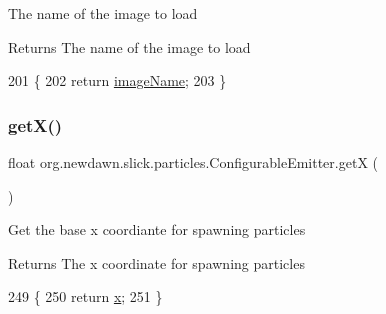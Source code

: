 The name of the image to load

\begin{DoxyReturn}{Returns}
The name of the image to load 
\end{DoxyReturn}

\begin{DoxyCode}
201                                  \{
202         \textcolor{keywordflow}{return} \mbox{\hyperlink{classorg_1_1newdawn_1_1slick_1_1particles_1_1_configurable_emitter_a912693fc97b59864d7ee322ad4f6ec17}{imageName}};
203     \}
\end{DoxyCode}
\mbox{\label{classorg_1_1newdawn_1_1slick_1_1particles_1_1_configurable_emitter_a726b720c6e526c8a7d165d6f111ef3db}} 
\subsubsection{\texorpdfstring{get\+X()}{getX()}}
{\footnotesize\ttfamily float org.\+newdawn.\+slick.\+particles.\+Configurable\+Emitter.\+getX (\begin{DoxyParamCaption}{ }\end{DoxyParamCaption})\hspace{0.3cm}{\ttfamily [inline]}}

Get the base x coordiante for spawning particles

\begin{DoxyReturn}{Returns}
The x coordinate for spawning particles 
\end{DoxyReturn}

\begin{DoxyCode}
249                         \{
250         \textcolor{keywordflow}{return} \mbox{\hyperlink{classorg_1_1newdawn_1_1slick_1_1particles_1_1_configurable_emitter_a4198d77b5f4ee2b55be6e4732744b9cb}{x}};
251     \}
\end{DoxyCode}
\mbox{\label{classorg_1_1newdawn_1_1slick_1_1particles_1_1_configurable_emitter_a1051b2582b827d13a89f2843b17fff5f}} 
